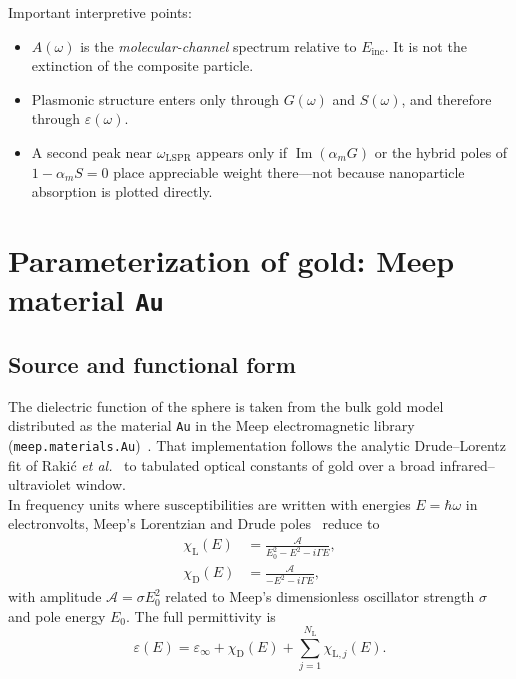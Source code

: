 \documentclass[11pt,a4paper]{article}
\begin{document}
\noindent
Important interpretive points:
\begin{itemize}[leftmargin=1.4em]
  \item $A(\omega)$ is the \emph{molecular-channel} spectrum relative to
        $E_{\mathrm{inc}}$.  It is not the extinction of the composite particle.
  \item Plasmonic structure enters only through $G(\omega)$ and $S(\omega)$, and
        therefore through $\varepsilon(\omega)$.
  \item A second peak near $\omega_{\mathrm{LSPR}}$ appears only if
        $\operatorname{Im}(\alpha_m G)$ or the hybrid poles of
        $1-\alpha_m S=0$ place appreciable weight there---not because nanoparticle
        absorption is plotted directly.
\end{itemize}

\section{Parameterization of gold: Meep material \texttt{Au}}
\label{sec:au}

\subsection{Source and functional form}

The dielectric function of the sphere is taken from the bulk gold model
distributed as the material \texttt{Au} in the Meep electromagnetic library
(\texttt{meep.materials.Au})~\citep{oskooi2010,meepdocs}.  That implementation follows the analytic
Drude--Lorentz fit of Raki\'{c} \emph{et al.}~\citep{rakic1998} to tabulated optical constants of
gold over a broad infrared--ultraviolet window.\\

\noindent
In frequency units where susceptibilities are written with energies $E=\hbar\omega$
in electronvolts, Meep's Lorentzian and Drude poles~\citep{oskooi2010} reduce to
\begin{align}
  \chi_{\mathrm{L}}(E)
  &=
  \frac{\mathcal{A}}{E_0^2 - E^2 - i\Gamma E},
  \label{eq:chiL} \\[0.35em]
  \chi_{\mathrm{D}}(E)
  &=
  \frac{\mathcal{A}}{-E^2 - i\Gamma E},
  \label{eq:chiD}
\end{align}
with amplitude $\mathcal{A}=\sigma E_0^2$ related to Meep's dimensionless
oscillator strength $\sigma$ and pole energy $E_0$.  The full permittivity is
\begin{equation}
  \varepsilon(E)
  =
  \varepsilon_\infty
  +
  \chi_{\mathrm{D}}(E)
  +
  \sum_{j=1}^{N_{\mathrm{L}}}
  \chi_{\mathrm{L},j}(E).
  \label{eq:eps-au}
\end{equation}
\end{document}
